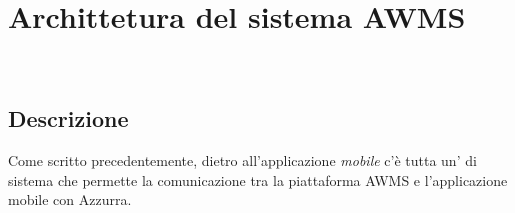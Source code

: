 \chapter{Archittetura del sistema AWMS}
\label{cap:archittettura del sistema AWMS}

\\


\section{Descrizione}
Come scritto precedentemente, dietro all'applicazione \emph{mobile} c'è tutta un' di sistema che permette la comunicazione tra la piattaforma \gls{AWMS} e l'applicazione mobile con Azzurra.
 

